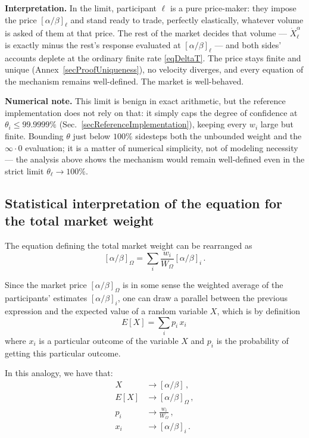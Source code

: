 \documentclass[letterpaper]{article}
\newcommand{\priceAB}{\left[\alpha / \beta\right]}
\begin{document}
\textbf{Interpretation.} In the limit, participant $\ell$ is a pure price-maker: they impose the price $\priceAB_\ell$ and stand ready to trade, perfectly elastically, whatever volume is asked of them at that price. The rest of the market decides that volume --- $\dot{X}_\ell^\alpha$ is exactly minus the rest's response evaluated at $\priceAB_\ell$ --- and both sides' accounts deplete at the ordinary finite rate \eqref{eqDeltaT}. The price stays finite and unique (Annex~\ref{secProofUniqueness}), no velocity diverges, and every equation of the mechanism remains well-defined. The market is well-behaved.

\textbf{Numerical note.} This limit is benign in exact arithmetic, but the reference implementation does not rely on that: it simply caps the degree of confidence at $\theta_i \leq 99.9999\%$ (Sec.~\ref{secReferenceImplementation}), keeping every $w_i$ large but finite. Bounding $\theta$ just below $100\%$ sidesteps both the unbounded weight and the $\infty \cdot 0$ evaluation; it is a matter of numerical simplicity, not of modeling necessity --- the analysis above shows the mechanism would remain well-defined even in the strict limit $\theta_\ell \to 100\%$.

\subsection{Statistical interpretation of the equation for the total market weight}\label{secStatisticalInterpretation}

The equation defining the total market weight can be rearranged as
\begin{equation*}
    \priceAB_\Omega = \sum_i \frac{w_i}{W_\Omega} \priceAB_i\,.
\end{equation*}

Since the market price $\priceAB_\Omega$ is in some sense the weighted average of the participants' estimates $\priceAB_i$, one can draw a parallel between the previous expression and the expected value of a random variable $X$, which is by definition
\begin{equation*}
    E[X] = \sum_i p_i \,x_i \,
\end{equation*}
where $x_i$ is a particular outcome of the variable $X$ and $p_i$ is the probability of getting this particular outcome.

In this analogy, we have that:
\begin{align*}
    X &\rightarrow \priceAB \, ,\\
    E[X] &\rightarrow \priceAB_\Omega \, , \\
    p_i &\rightarrow \frac{w_i}{W_\Omega} \, ,\\
    x_i &\rightarrow \priceAB_i \,.
\end{align*}
\end{document}
